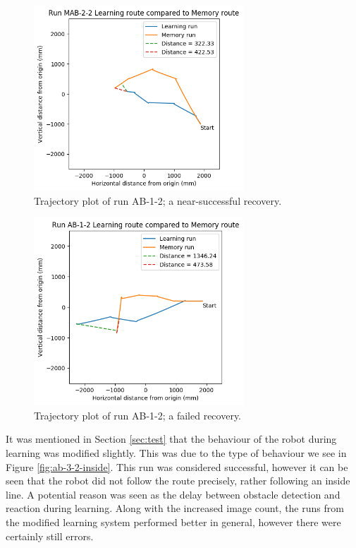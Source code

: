 \documentclass[a4paper,11pt,twoside,openright]{article}
\begin{document}
\begin{figure}
 \centering
  \includegraphics[width=0.7\textwidth]{MAB-2-2}
  \caption{
    \label{fig:mab-2-2-succ} Trajectory plot of run AB-1-2; a near-successful recovery.
  }
\end{figure}


\begin{figure}
 \centering
  \includegraphics[width=0.7\textwidth]{AB-1-2}
  \caption{
    \label{fig:ab-1-2-fail} Trajectory plot of run AB-1-2; a failed recovery.
  }
\end{figure}

It was mentioned in Section \ref{sec:test} that the behaviour of the robot during learning was modified slightly. This
was due to the type of behaviour we see in Figure \ref{fig:ab-3-2-inside}. This run was considered successful, however it can be seen
that the robot did not follow the route precisely, rather following an inside line. A potential reason was seen as the
delay between obstacle detection and reaction during learning. Along with the increased image count, the runs from
the modified learning system performed better in general, however there were certainly still errors.
\newline
\end{document}
